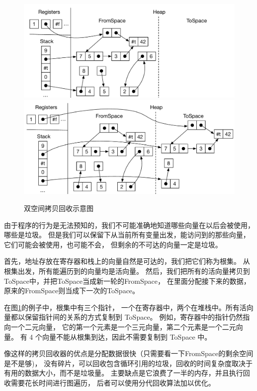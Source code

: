 \begin{figure}[t]
\centering
\includegraphics[width=\textwidth]{figures/copy-collect-1} \\[5ex]
\includegraphics[width=\textwidth]{figures/copy-collect-2}
\caption{双空间拷贝回收示意图}
\label{fig:copying-collector}
\end{figure}

由于程序的行为是无法预知的，我们不可能准确地知道哪些向量在以后会被使用，哪些是垃圾。
但是我们可以保留下从当前所有变量出发，能访问到的那些向量，它们可能会被使用，也可能不会，
但剩余的不可达的向量一定是垃圾。

首先，地址存放在寄存器和栈上的向量自然是可达的，我们把它们称为根集。
从根集出发，所有能遍历到的向量均是活向量。
然后，我们把所有的活向量拷贝到ToSpace中，并把ToSpace当成新一轮的FromSpace，
在里面分配接下来的数据，原来的FromSpace则当成下一次的ToSpace。

在图\ref{fig:copying-collector}的例子中，根集中有三个指针，
一个在寄存器中，两个在堆栈中。所有活向量都以保留指针间的关系的方式复制到 ToSpace。
例如，寄存器中的指针仍然指向一个二元向量，
它的第一个元素是一个三元向量，第二个元素是一个二元向量。
有 4 个向量不能从根集到达，因此不需要复制到 ToSpace 中。

像这样的拷贝回收器的优点是分配数据很快（只需要看一下FromSpace的剩余空间是不是够)，
没有碎片，可以回收包含循环引用的垃圾，回收的时间复杂度取决于有用的数据大小，而不是垃圾量。
主要缺点是它浪费了一半的内存，并且执行回收需要花长时间进行图遍历，
后者可以使用分代回收算法加以优化。

